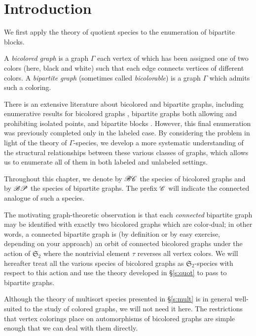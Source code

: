\documentclass[sectionflow,singlespace,twoside,boldmathhdr]{brandiss} %
\numberwithin{section}{chapter}
\numberwithin{figure}{chapter}
\begin{document}
\section{Introduction}\label{s:bpintro}
We first apply the theory of quotient species to the enumeration of bipartite blocks.

\begin{definition}
  \label{def:bcgraph}
  A \emph{bicolored graph} is a graph $\Gamma$ each vertex of which has been assigned one of two colors (here, black and white) such that each edge connects vertices of different colors.
  A \emph{bipartite graph} (sometimes called \emph{bicolorable}) is a graph $\Gamma$ which admits such a coloring.  
\end{definition}

There is an extensive literature about bicolored and bipartite graphs, including enumerative results for bicolored graphs \cite{har:bicolored}, bipartite graphs both allowing \cite{han:bipartite} and prohibiting \cite{harprins:bipartite} isolated points, and bipartite blocks \cite{harrob:bipblocks}.
However, this final enumeration was previously completed only in the labeled case.
By considering the problem in light of the theory of $\Gamma$-species, we develop a more systematic understanding of the structural relationships between these various classes of graphs, which allows us to enumerate all of them in both labeled and unlabeled settings.

Throughout this chapter, we denote by $\mathscr{BC}$ the species of bicolored graphs and by $\mathscr{BP}$ the species of bipartite graphs.
The prefix $\mathscr{C}$ will indicate the connected analogue of such a species.

The motivating graph-theoretic observation is that each \emph{connected} bipartite graph may be identified with exactly two bicolored graphs which are color-dual; in other words, a connected bipartite graph is (by definition or by easy exercise, depending on your approach) an orbit of connected bicolored graphs under the action of $\mathfrak{S}_{2}$ where the nontrivial element $\tau$ reverses all vertex colors.
We will hereafter treat all the various species of bicolored graphs as $\mathfrak{S}_{2}$-species with respect to this action and use the theory developed in \S \ref{s:quot} to pass to bipartite graphs.

Although the theory of multisort species presented in \S \ref{s:mult} is in general well-suited to the study of colored graphs, we will not need it here.
The restrictions that vertex colorings place on automorphisms of bicolored graphs are simple enough that we can deal with them directly.
\end{document}
